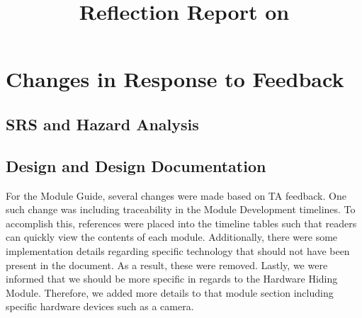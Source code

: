 \documentclass{article}
\title{Reflection Report on \progname}
\author{\authname}
\date{}
\begin{document}
\maketitle


\section{Changes in Response to Feedback}




\subsection{SRS and Hazard Analysis}



\subsection{Design and Design Documentation}

For the Module Guide, several changes were made based on TA feedback. One such change was
including traceability in the Module Development timelines. To accomplish this, references
were placed into the timeline tables such that readers can quickly view the contents of each
module. Additionally, there were some implementation details regarding specific technology that
should not have been present in the document. As a result, these were removed. Lastly, we were
informed that we should be more specific in regards to the Hardware Hiding Module. Therefore,
we added more details to that module section including specific hardware devices such as a camera.
\end{document}
